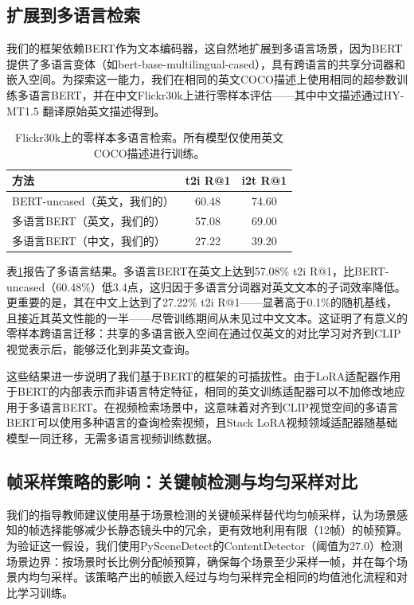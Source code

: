 \documentclass[10pt,a4paper]{ctexart}
\begin{document}
\subsection{扩展到多语言检索}

我们的框架依赖BERT作为文本编码器，这自然地扩展到多语言场景，因为BERT提供了多语言变体（如bert-base-multilingual-cased），具有跨语言的共享分词器和嵌入空间。为探索这一能力，我们在相同的英文COCO描述上使用相同的超参数训练多语言BERT，并在中文Flickr30k上进行零样本评估——其中中文描述通过HY-MT1.5 \citep{hymt152025tencent}翻译原始英文描述得到。

\begin{table}[h]
\centering
\caption{Flickr30k上的零样本多语言检索。所有模型仅使用英文COCO描述进行训练。}
\label{tab:multilingual}
\begin{tabular}{lcc}
\toprule
方法 & t2i R@1 & i2t R@1 \\
\midrule
BERT-uncased（英文，我们的） & 60.48 & 74.60 \\
多语言BERT（英文，我们的） & 57.08 & 69.00 \\
多语言BERT（中文，我们的） & 27.22 & 39.20 \\
\bottomrule
\end{tabular}
\end{table}

表\ref{tab:multilingual}报告了多语言结果。多语言BERT在英文上达到57.08\% t2i R@1，比BERT-uncased（60.48\%）低3.4点，这归因于多语言分词器对英文文本的子词效率降低。更重要的是，其在中文上达到了27.22\% t2i R@1——显著高于0.1\%的随机基线，且接近其英文性能的一半——尽管训练期间从未见过中文文本。这证明了有意义的零样本跨语言迁移：共享的多语言嵌入空间在通过仅英文的对比学习对齐到CLIP视觉表示后，能够泛化到非英文查询。

这些结果进一步说明了我们基于BERT的框架的可插拔性。由于LoRA适配器作用于BERT的内部表示而非语言特定特征，相同的英文训练适配器可以不加修改地应用于多语言BERT。在视频检索场景中，这意味着对齐到CLIP视觉空间的多语言BERT可以使用多种语言的查询检索视频，且Stack LoRA视频领域适配器随基础模型一同迁移，无需多语言视频训练数据。

\subsection{帧采样策略的影响：关键帧检测与均匀采样对比}

我们的指导教师建议使用基于场景检测的关键帧采样替代均匀帧采样，认为场景感知的帧选择能够减少长静态镜头中的冗余，更有效地利用有限（12帧）的帧预算。为验证这一假设，我们使用PySceneDetect的ContentDetector（阈值为27.0）检测场景边界：按场景时长比例分配帧预算，确保每个场景至少采样一帧，并在每个场景内均匀采样。该策略产出的帧嵌入经过与均匀采样完全相同的均值池化流程和对比学习训练。
\end{document}
